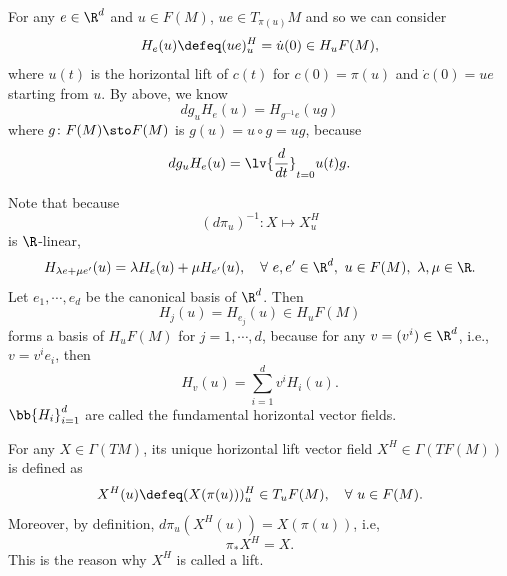 For any $e \in \R^d$ and $u \in F(M)$, $ue \in T_{\pi(u)}M$ and so we can consider 
\begin{equation*}
    H_e(u) \defeq (ue)^H_u = \dot{u}(0) \in H_uF(M),
\end{equation*}
where $u(t)$ is the horizontal lift of $c(t)$ for $c(0) = \pi(u)$ and $\dot{c}(0) = ue$ starting from $u$. By above, we know
\begin{equation*}
    dg_u H_e(u) = H_{g^{-1}e}(ug)
\end{equation*}
where $g \colon F(M) \sto F(M)$ is $g(u) = u \circ g = ug$, because
\begin{equation*}
    dg_u H_e(u) = \lv{\frac{d}{dt}}_{t = 0} u(t)g.
\end{equation*}
\begin{rmk}
    Note that because
    \begin{equation*}
        (d\pi_u)^{-1}\colon X \mapsto X^H_u
    \end{equation*}
    is $\R$-linear,
    \begin{equation*}
        H_{\lambda e + \mu e^\prime}(u) = \lambda H_e(u) + \mu H_{e^\prime}(u),\quad \forall~e,e^\prime \in \R^d,~u \in F(M),~\lambda,\mu \in \R.
    \end{equation*}
    Let $e_1,\cdots,e_d$ be the canonical basis of $\R^d$. Then
    \begin{equation*}
        H_j(u) = H_{e_j}(u) \in H_uF(M)
    \end{equation*}
    forms a basis of $H_uF(M)$ for $j=1,\cdots,d$, because for any $v = (v^i) \in \R^d$, i.e., $v = v^ie_i$, then
    \begin{equation*}
        H_v(u) = \sum_{i=1}^d v^iH_i(u).
    \end{equation*}
    $\bb{H_i}_{i=1}^d$ are called the fundamental horizontal vector fields.
\end{rmk}

\begin{rmk}
    For any $X \in \Gamma(TM)$, its unique horizontal lift vector field $X^H \in \Gamma(TF(M))$ is defined as
    \begin{equation*}
        X^H(u) \defeq (X(\pi(u)))_u^H \in T_uF(M),\quad\forall~u\in F(M).
    \end{equation*}
    Moreover, by definition, $d\pi_u (X^H(u)) = X(\pi(u))$, i.e,
    \begin{equation*}
        \pi_* X^H = X.
    \end{equation*}
    This is the reason why $X^H$ is called a lift.
\end{rmk}

